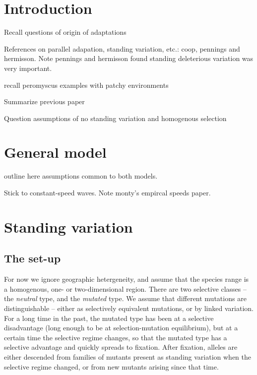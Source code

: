 \documentclass{article}
\begin{document}
\section{Introduction}

Recall questions of origin of adaptations

References on parallel adapation, standing variation, etc.:
  coop,
  pennings and hermisson.
Note pennings and hermisson found standing deleterious variation was very important.  

recall peromyscus examples with patchy environments

Summarize previous paper

Question assumptions of no standing variation and homogenous selection

\section{General model}

outline here assumptions common to both models.

Stick to constant-speed waves.
Note monty's empircal speeds paper.

\section{Standing variation}

\subsection{The set-up}


For now we ignore geographic hetergeneity, and assume that the species range
is a homogenous, one- or two-dimensional region. 
There are two selective classes -- the {\em neutral} type, and the {\em mutated} type.
We assume that different mutations are distinguishable --
either as selectively equivalent mutations, or by linked variation.
For a long time in the past, the mutated type has been at a selective disadvantage (long enough to be at selection-mutation equilibrium),
but at a certain time the selective regime changes, so that the mutated type has a selective advantage and quickly spreads to fixation.
After fixation, alleles are either descended
from families of mutants present as standing variation when the selective regime changed,
or from new mutants arising since that time.
\end{document}
